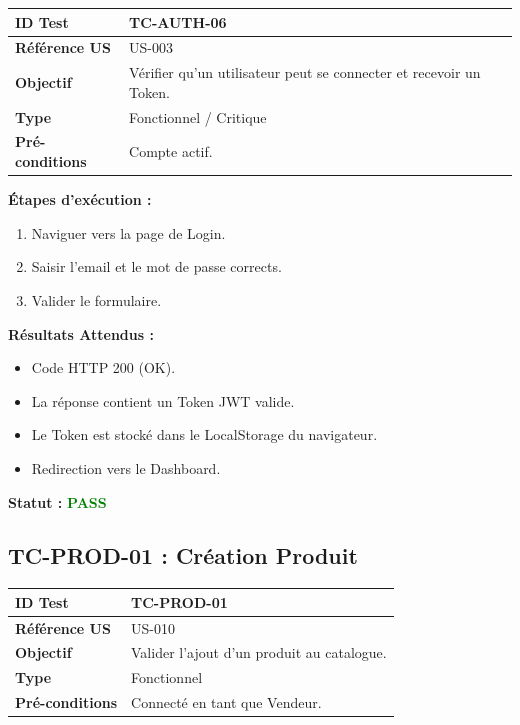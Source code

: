 \documentclass[12pt,a4paper]{article}
\begin{document}
\begin{tabular}{|l|p{10cm}|}
    \hline
    \textbf{ID Test} & TC-AUTH-06 \\ \hline
    \textbf{Référence US} & US-003 \\ \hline
    \textbf{Objectif} & Vérifier qu'un utilisateur peut se connecter et recevoir un Token. \\ \hline
    \textbf{Type} & Fonctionnel / Critique \\ \hline
    \textbf{Pré-conditions} & Compte actif. \\ \hline
\end{tabular}

\vspace{0.5cm}
\textbf{Étapes d'exécution :}
\begin{enumerate}
    \item Naviguer vers la page de Login.
    \item Saisir l'email et le mot de passe corrects.
    \item Valider le formulaire.
\end{enumerate}

\vspace{0.5cm}
\textbf{Résultats Attendus :}
\begin{itemize}
    \item Code HTTP 200 (OK).
    \item La réponse contient un Token JWT valide.
    \item Le Token est stocké dans le LocalStorage du navigateur.
    \item Redirection vers le Dashboard.
\end{itemize}

\vspace{0.5cm}
\textbf{Statut :} \textcolor{green}{\textbf{PASS}}

\subsection{TC-PROD-01 : Création Produit}

\begin{tabular}{|l|p{10cm}|}
    \hline
    \textbf{ID Test} & TC-PROD-01 \\ \hline
    \textbf{Référence US} & US-010 \\ \hline
    \textbf{Objectif} & Valider l'ajout d'un produit au catalogue. \\ \hline
    \textbf{Type} & Fonctionnel \\ \hline
    \textbf{Pré-conditions} & Connecté en tant que Vendeur. \\ \hline
\end{tabular}
\end{document}
